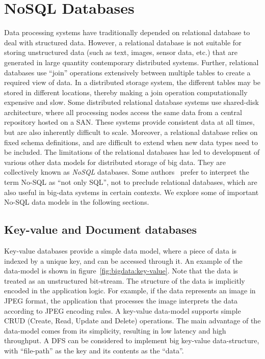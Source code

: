 \section{NoSQL Databases}
\label{sec:bigdata:nosql}

Data processing systems have traditionally depended on relational database to deal with structured data. However, a relational
database is not suitable for storing unstructured data (such as text, images, sensor data, etc.) that are generated in large
quantity contemporary distributed systems. Further, relational databases use ``join'' operations extensively between multiple 
tables to create a required view of data. In a distributed storage system, the different tables may be stored in different
locations, thereby making a join operation computationally expensive and slow. Some distributed relational database systems
use shared-disk architecture, where all processing nodes access the same data from a central repository hosted on a SAN.
These systems provide consistent data at all times, but are also inherently difficult to scale. Moreover, a relational database relies 
on fixed schema definitions, and are difficult to extend when new data types need to be included.
%
The limitations of the relational databases has led to development of various other data models for distributed storage of big data. 
They are collectively known as {\em NoSQL} databases. Some authors~\citep{Han:2011} prefer to interpret the term No-SQL as ``not 
only SQL'', not to preclude relational databases, which are also useful in big-data systems in certain contexts. We explore some of 
important No-SQL data models in the following sections.

\subsection{Key-value and Document databases}
\label{sec:bigdata:key-value}

Key-value databases provide  a simple data model, where a piece of data is indexed by a unique key, and can be accessed through it. 
An example of the data-model is shown in figure~\ref{fig:bigdata:key-value}. Note that the data is treated as an unstructured bit-stream. 
The structure of the data is implicitly encoded  in the application logic. For example, if the data represents an image in JPEG format, 
the application that processes the image interprets the data according to JPEG encoding rules. A key-value data-model supports simple 
CRUD (Create, Read, Update and Delete) operations. The main advantage of the data-model comes from its simplicity, resulting in low 
latency and high throughput. A DFS can be considered to implement big key-value data-structure, with ``file-path'' as the key and its 
contents as the ``data''.

